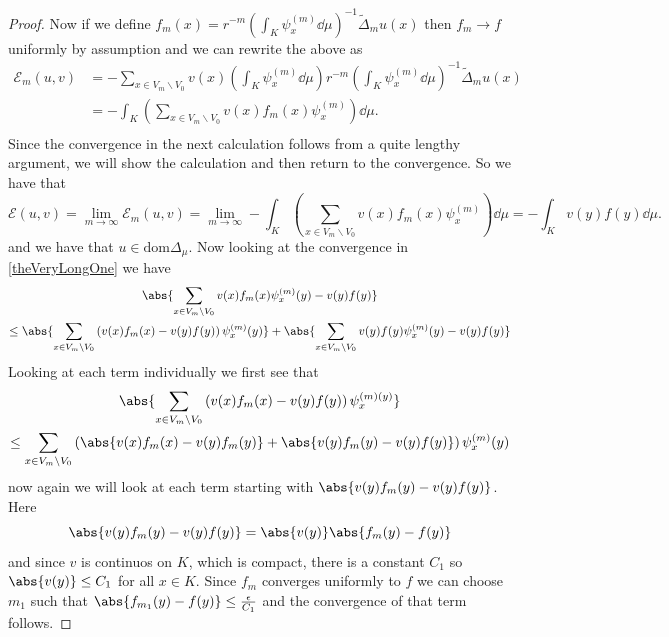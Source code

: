 \begin{proof}
	Now if we define $f_m(x) = r^{-m} \left(\int_{K} \psi_{x}^{(m)} \dd\mu \right)^{-1} \widetilde{\Delta}_{m}u(x)$ then $f_m \to f$ uniformly by assumption and we can rewrite the above as   
	\begin{align}
		\mathcal{E}_m(u,v) &= -\sum_{x \in V_m \backslash V_0} v(x) \left(\int_{K} \psi_{x}^{(m)} \dd\mu \right) r^{-m} \left(\int_{K} \psi_{x}^{(m)} \dd\mu \right)^{-1} \widetilde{\Delta}_{m}u(x) \\
		&= - \int_{K} \left( \sum_{x \in V_m \backslash V_0} v(x) f_m(x) \psi_x^{(m)}\right) \dd \mu. \\
	\end{align}
	Since the convergence in the next calculation follows from a quite lengthy argument, we will show the calculation and then return to the convergence. So we have that 
	\begin{equation}\label{theVeryLongOne}
		\mathcal{E}(u, v) = \lim_{m \to \infty} \mathcal{E}_m(u,v) = \lim_{m \to \infty}-\int_{K} \left( \sum_{x \in V_m \backslash V_0} v(x) f_m(x) \psi_x^{(m)}\right) \dd \mu = - \int_{K} v(y)f(y) \dd \mu.
	\end{equation}
	and we have that $u \in \text{dom}\Delta_{\mu}$. Now looking at the convergence in \eqref{theVeryLongOne} we have
	\begin{multline}
		\abs{\sum_{x \in V_m \backslash V_0} v(x) f_m(x) \psi_x^{(m)}(y) -v(y)f(y)} \\
		\leq \abs{\sum_{x \in V_m \backslash V_0} \left(v(x) f_m(x) - v(y)f(y) \right) \psi_x^{(m)}(y)} + \abs{\sum_{x \in V_m \backslash V_0} v(y) f(y) \psi_x^{(m)}(y) -v(y)f(y)}
	\end{multline}
	Looking at each term individually we first see that
	\begin{multline}
		\abs{\sum_{x \in V_m \backslash V_0} \left(v(x) f_m(x) - v(y)f(y) \right) \psi_x^{(m)(y)}} \\ 
		\leq \sum_{x \in V_m \backslash V_0} \left(\abs{v(x) f_m(x) - v(y)f_m(y)} + \abs{v(y)f_m(y) - v(y)f(y)}\right) \psi_x^{(m)}(y)
	\end{multline}
	now again we will look at each term starting with $\abs{v(y) f_m(y) - v(y)f(y)}$. Here
	$$\abs{v(y) f_m(y) - v(y)f(y)} = \abs{v(y)}\abs{f_m(y) - f(y)}$$
	and since $v$ is continuos on $K$, which is compact, there is a constant $C_1$ so $\abs{v(y)} \leq C_1$ for all $x \in K$. Since $f_m$ converges uniformly to $f$ we can choose $m_1$ such that $\abs{f_{m_1}(y)- f(y)} \leq \frac{\epsilon}{C_1}$ and the convergence of that term follows.
	

\end{proof}
